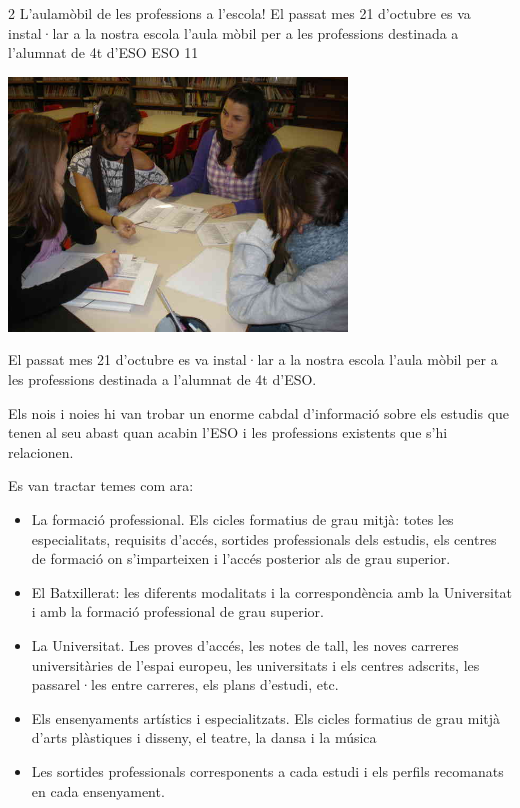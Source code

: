 %
%
\begin{news}
{2} %
{L'aulamòbil de les professions a l'escola!}
{El passat mes 21 d’octubre es va instal·lar a la nostra escola l’aula mòbil per a les professions destinada a l’alumnat de 4t d’ESO}
{ESO}
{11} %

\noindent\includegraphics[width=9cm,keepaspectratio]{eso/img/gen/Aulamobil3_dpi_lowres.JPG}

El passat mes 21 d’octubre es va instal·lar a la nostra escola l’aula mòbil per a les professions destinada a l’alumnat de 4t d’ESO.

Els nois i noies hi van trobar un enorme cabdal d’informació sobre els estudis que tenen al seu abast quan acabin l’ESO i les professions existents que s’hi relacionen.

Es van tractar temes com ara:

\begin{itemize}

	\item La formació professional. Els cicles formatius de grau mitjà: totes les especialitats, requisits d’accés, sortides professionals dels estudis, els centres de formació on s’imparteixen i l’accés posterior als de grau superior.

	\item El Batxillerat: les diferents modalitats i la correspondència amb la Universitat i amb la formació professional de grau superior.

	\item La Universitat. Les proves d’accés, les notes de tall, les noves carreres universitàries de l’espai europeu, les universitats i els centres adscrits, les passarel·les entre carreres, els plans d’estudi, etc.

	\item Els ensenyaments artístics i especialitzats. Els cicles formatius de grau mitjà d’arts plàstiques i disseny, el teatre, la dansa i la música

	\item Les sortides professionals corresponents a cada estudi i els perfils recomanats en cada ensenyament. 

\end{itemize}

\end{news}
